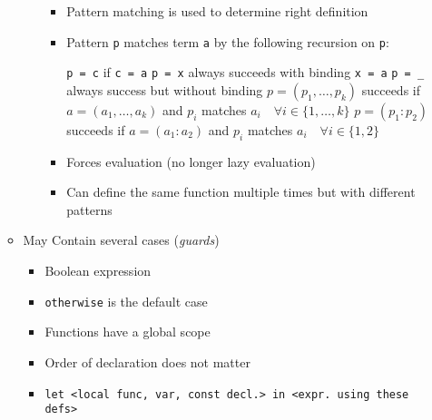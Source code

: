 \begin{itemize}
\begin{itemize}
\begin{itemize}
\begin{itemize}
                        \end{itemize}
                        \begin{itemize}
                            \item Pattern matching is used to determine right definition
                            \item Pattern \verb+p+ matches term \verb+a+ by the following recursion on \verb+p+:
                                \begin{itemize}
                                     \verb+p = c+ if \verb+c = a+
                                     \verb+p = x+ always succeeds with binding \verb+x = a+
                                     \verb+p = _+ always success but without binding
                                     $p = (p_1, \dots , p_k)$ succeeds if $a = (a_1, \dots , a_k)$ and $p_i$ matches $a_i \quad \forall i \in \{1, \dots , k\} $
                                     $p = (p_1 : p_2)$ succeeds if $a = (a_1 : a_2)$ and $p_i$ matches $a_i \quad \forall i \in \{1, 2\}$
                                \end{itemize}
                            \item Forces evaluation (no longer lazy evaluation)
                            \item Can define the same function multiple times but with different patterns
                        \end{itemize}
                \end{itemize}
            \item May Contain several cases (\textit{guards})
                \begin{itemize}
                    \item Boolean expression
                    \item \verb+otherwise+ is the default case
                \end{itemize}
                \begin{itemize}
                    \item Functions have a global scope
                    \item Order of declaration does not matter
                    \item \verb+let <local func, var, const decl.> in <expr. using these defs>+
                        \begin{itemize}

\end{itemize}
\end{itemize}
\end{itemize}
\end{itemize}
